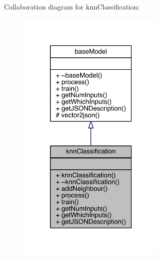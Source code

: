 Collaboration diagram for knn\+Classification\+:
\nopagebreak
\begin{figure}[H]
\begin{center}
\leavevmode
\includegraphics[width=202pt]{classknn_classification__coll__graph}
\end{center}
\end{figure}
